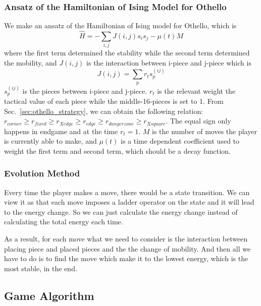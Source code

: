 \documentclass[aps,pra,preprint,amsmath,amssymb,floatfix]{revtex4-2}
\begin{document}
\subsubsection{Ansatz of the Hamiltonian of Ising Model for Othello}
We make an ansatz of the Hamiltonian of Ising model for Othello, which is
\begin{equation}
    \hat{H}=-\sum_{i,j}J(i,j)s_is_j-\mu(t)M
\end{equation}
where the first term determined the stability while the second term determined the mobility, and $J(i,j)$ is the interaction between i-piece and j-piece which is
\begin{equation}
    J(i,j) = \sum_p r_ts_p^{(ij)}
\end{equation}
$s_p^{(ij)}$ is the pieces between i-piece and j-piece. $r_t$ is the relevant weight the tactical value of each piece while the middle-16-pieces is set to 1. From Sec.~\ref{sec:othello_strategy}, we can obtain the following relation:
$r_{corner} \geq r_{fixed} \geq r_{X edge} \geq r_{edge}\geq r_{danger zone} \geq r_{X square}$.
The equal sign only happens in endgame and at the time $r_t = 1$. $M$ is the number of moves the
player is currently able to make, and $\mu(t)$ is a time dependent coefficient used to weight the first term and second term, which should be a decay function.

\subsubsection{Evolution Method}
Every time the player makes a move, there would be a state transition. We can view it as that each move imposes a ladder operator on the state and it will lead to the energy change. So we can just calculate the energy change instead of calculating the total energy each time. 

As a result, for each move what we need to consider is the interaction between placing piece and placed pieces and the the change of mobility. And then all we have to do is to find the move which make it to the lowest energy, which is the most stable, in the end.

\subsection{Game Algorithm}
\end{document}
